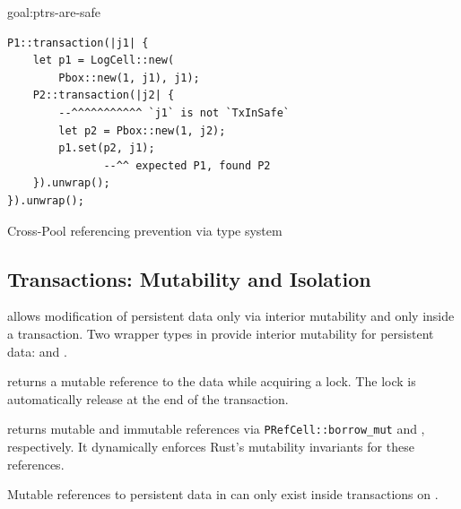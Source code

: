 \begin{goaltrue}{goal:ptrs-are-safe}
\begin{lstfloat}
\begin{lstlisting}
P1::transaction(|j1| {
    let p1 = LogCell::new(
        Pbox::new(1, j1), j1);
    P2::transaction(|j2| {
        --^^^^^^^^^^^ `j1` is not `TxInSafe`
        let p2 = Pbox::new(1, j2);
        p1.set(p2, j1);
               --^^ expected P1, found P2
    }).unwrap();
}).unwrap();
\end{lstlisting}
\caption{Cross-Pool referencing prevention via type system}
\label{lst:cross}
\end{lstfloat}
\end{goaltrue}
  
\subsection{Transactions: Mutability and Isolation}

\This{} allows modification of persistent data only via interior mutability
and only inside a transaction.
Two wrapper types in  provide interior mutability for persistent data:
 and .%

 returns a mutable reference to the data while
acquiring a lock.  The lock is automatically release at the end of the
transaction.

 returns mutable and immutable references via\linebreak
\texttt{PRefCell::borrow\_mut} and ,
respectively.  It dynamically enforces Rust's mutability
invariants for these references.


\begin{invar}
  \label{inv:mutable-in-tx-only}
  Mutable references to persistent data in  can only exist inside transactions on .
\end{invar}

